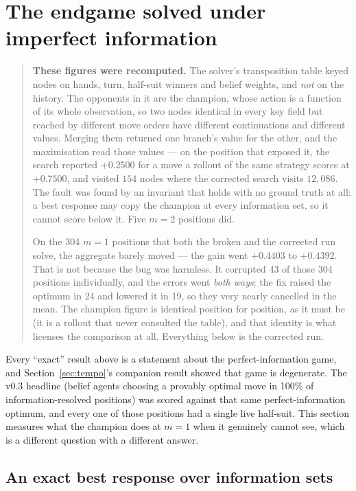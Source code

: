 \documentclass[11pt,letterpaper]{article}
\begin{document}
\section{The endgame solved under imperfect information}
\label{sec:ii}

\begin{quote}
\textbf{These figures were recomputed.} The solver's transposition table keyed
nodes on hands, turn, half-suit winners and belief weights, and \emph{not} on
the history. The opponents in it are the champion, whose action is a function
of its whole observation, so two nodes identical in every key field but reached
by different move orders have different continuations and different values.
Merging them returned one branch's value for the other, and the maximisation
read those values --- on the position that exposed it, the search reported
$+0.2500$ for a move a rollout of the same strategy scores at $+0.7500$, and
visited $154$ nodes where the corrected search visits $12{,}086$. The fault was
found by an invariant that holds with no ground truth at all: a best response
may copy the champion at every information set, so it cannot score below it.
Five $m = 2$ positions did.

On the 304 $m = 1$ positions that both the broken and the corrected run solve,
the aggregate barely moved --- the gain went $+0.4403$ to $+0.4392$. That is not
because the bug was harmless. It corrupted 43 of those 304 positions
individually, and the errors went \emph{both ways}: the fix raised the optimum
in 24 and lowered it in 19, so they very nearly cancelled in the mean. The
champion figure is identical position for position, as it must be (it is a
rollout that never consulted the table), and that identity is what licenses
the comparison at all. Everything below is the corrected run.
\end{quote}

Every ``exact'' result above is a statement about the perfect-information game,
and Section~\ref{sec:tempo}'s companion result showed that game is degenerate.
The v0.3 headline (belief agents choosing a provably optimal move in 100\%
of information-resolved positions) was scored against that same
perfect-information optimum, and every one of those positions had a single live
half-suit. This section measures what the champion does at $m = 1$ when it
genuinely cannot see, which is a different question with a different answer.

\subsection{An exact best response over information sets}
\end{document}
